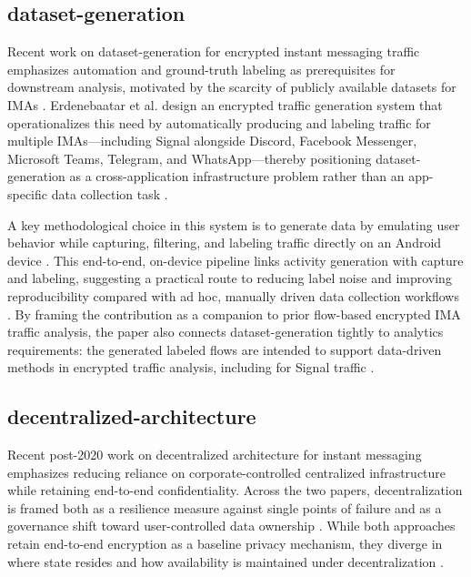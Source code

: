 \subsection{dataset-generation}

Recent work on dataset-generation for encrypted instant messaging traffic emphasizes automation and ground-truth labeling as prerequisites for downstream analysis, motivated by the scarcity of publicly available datasets for IMAs \cite{erdenebaatar2023}. Erdenebaatar et al. design an encrypted traffic generation system that operationalizes this need by automatically producing and labeling traffic for multiple IMAs—including Signal alongside Discord, Facebook Messenger, Microsoft Teams, Telegram, and WhatsApp—thereby positioning dataset-generation as a cross-application infrastructure problem rather than an app-specific data collection task \cite{erdenebaatar2023}.

A key methodological choice in this system is to generate data by emulating user behavior while capturing, filtering, and labeling traffic directly on an Android device \cite{erdenebaatar2023}. This end-to-end, on-device pipeline links activity generation with capture and labeling, suggesting a practical route to reducing label noise and improving reproducibility compared with ad hoc, manually driven data collection workflows \cite{erdenebaatar2023}. By framing the contribution as a companion to prior flow-based encrypted IMA traffic analysis, the paper also connects dataset-generation tightly to analytics requirements: the generated labeled flows are intended to support data-driven methods in encrypted traffic analysis, including for Signal traffic \cite{erdenebaatar2023}.

\subsection{decentralized-architecture}
Recent post-2020 work on decentralized architecture for instant messaging emphasizes reducing reliance on corporate-controlled centralized infrastructure while retaining end-to-end confidentiality. Across the two papers, decentralization is framed both as a resilience measure against single points of failure and as a governance shift toward user-controlled data ownership \cite{mashru2023,kanimozhi2025}. While both approaches retain end-to-end encryption as a baseline privacy mechanism, they diverge in where state resides and how availability is maintained under decentralization \cite{mashru2023,kanimozhi2025}.

